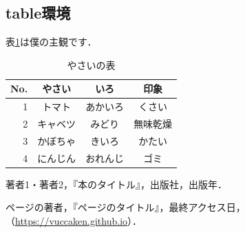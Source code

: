 \documentclass[uplatex,dvipdfmx,10pt,b5paper,papersize]{jsbook}
\begin{document}
\subsection{table環境}
表\ref{tbl:vegetable}は僕の主観です．
\begin{table}[htbp]
  \centering
  \caption{やさいの表}
  \label{tbl:vegetable}
  \begin{tabular}{r|ccc} \hline
    No. & やさい & いろ & 印象 \\ \hline
    1 & トマト & あかいろ & くさい \\
    2 & キャベツ & みどり & 無味乾燥 \\
    3 & かぼちゃ & きいろ & かたい \\
    4 & にんじん & おれんじ & ゴミ \\ \hline
  \end{tabular}
\end{table}

\begin{thebibliography}{99}
  \item 著者1・著者2，『本のタイトル』，出版社，出版年．
  \item ページの著者，『ページのタイトル』，最終アクセス日，\\
    （\url{https://vuccaken.github.io}）．
\end{thebibliography}
\end{document}
